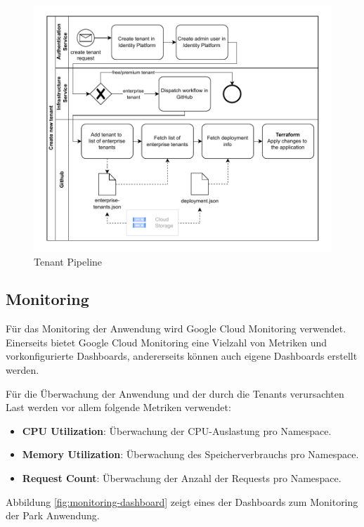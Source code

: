 \begin{figure}[H]
  \centering
  \includegraphics[width=\textwidth]{resources/tenant-pipeline.pdf}
  \caption{Tenant Pipeline}
  \label{fig:tenant-pipeline}
\end{figure}

\subsection{Monitoring}

Für das Monitoring der Anwendung wird Google Cloud Monitoring verwendet.
Einerseits bietet Google Cloud Monitoring eine Vielzahl von Metriken und vorkonfigurierte Dashboards,
andererseits können auch eigene Dashboards erstellt werden.

Für die Überwachung der Anwendung und der durch die Tenants verursachten Last werden 
vor allem folgende Metriken verwendet:

\begin{itemize}
  \item \textbf{CPU Utilization}: Überwachung der CPU-Auslastung pro Namespace.
  \item \textbf{Memory Utilization}: Überwachung des Speicherverbrauchs pro Namespace.
  \item \textbf{Request Count}: Überwachung der Anzahl der Requests pro Namespace.
\end{itemize}

Abbildung \ref{fig:monitoring-dashboard} zeigt eines der Dashboards zum Monitoring der Park Anwendung.

